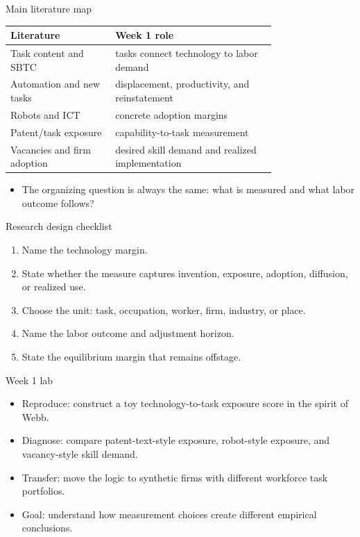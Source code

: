 \documentclass[aspectratio=169,11pt]{beamer}
\begin{document}
\begin{frame}{Main literature map}
\small
\begin{tabular}{p{0.30\linewidth} p{0.46\linewidth}}
\toprule
Literature & Week 1 role \\
\midrule
Task content and SBTC & tasks connect technology to labor demand \\
Automation and new tasks & displacement, productivity, and reinstatement \\
Robots and ICT & concrete adoption margins \\
Patent/task exposure & capability-to-task measurement \\
Vacancies and firm adoption & desired skill demand and realized implementation \\
\bottomrule
\end{tabular}
\vspace{0.3cm}
\begin{itemize}
    \item The organizing question is always the same: what is measured and what labor outcome follows?
\end{itemize}
\end{frame}

\begin{frame}{Research design checklist}
\begin{enumerate}
    \item Name the technology margin.
    \item State whether the measure captures invention, exposure, adoption, diffusion, or realized use.
    \item Choose the unit: task, occupation, worker, firm, industry, or place.
    \item Name the labor outcome and adjustment horizon.
    \item State the equilibrium margin that remains offstage.
\end{enumerate}
\end{frame}

\begin{frame}{Week 1 lab}
\begin{itemize}
    \item Reproduce: construct a toy technology-to-task exposure score in the spirit of Webb.
    \item Diagnose: compare patent-text-style exposure, robot-style exposure, and vacancy-style skill demand.
    \item Transfer: move the logic to synthetic firms with different workforce task portfolios.
    \item Goal: understand how measurement choices create different empirical conclusions.
\end{itemize}
\end{frame}
\end{document}

